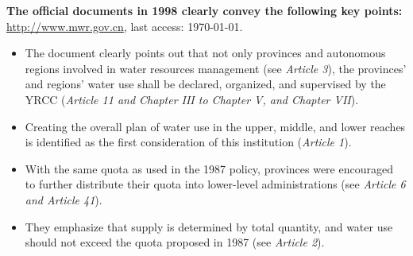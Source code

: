 \textbf{The official documents in 1998 clearly convey the following key points:}
\href{http://www.mwr.gov.cn/ztpd/2013ztbd/2013fxkh/fxkhswcbcs/cs/flfg/201304/t20130411_433489.html}{http://www.mwr.gov.cn}, last access: \today.
\begin{itemize}
	\item The document clearly points out that not only provinces and autonomous regions involved in water resources management (see \textit{Article 3}), the provinces’ and regions’ water use shall be declared, organized, and supervised by the YRCC (\textit{Article 11 and Chapter III to Chapter V, and Chapter VII}).
	\item Creating the overall plan of water use in the upper, middle, and lower reaches is identified as the first consideration of this institution (\textit{Article 1}).
	\item With the same quota as used in the 1987 policy, provinces were encouraged to further distribute their quota into lower-level administrations (see \textit{Article 6 and Article 41}).
	\item They emphasize that supply is determined by total quantity, and water use should not exceed the quota proposed in 1987 (see \textit{Article 2}).
\end{itemize}


